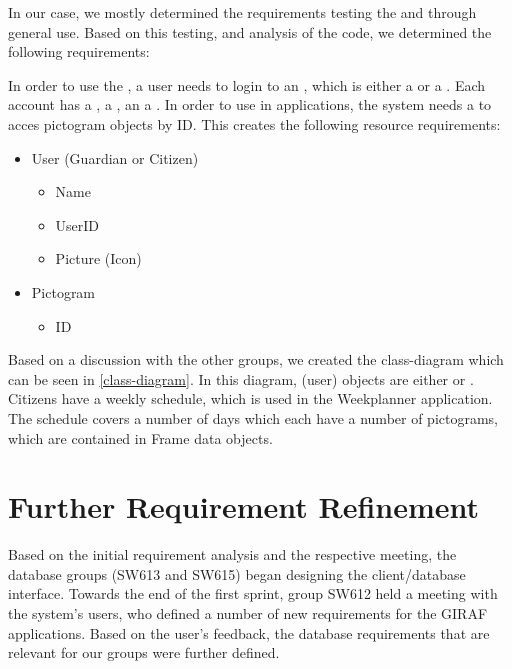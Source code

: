 In our case, we mostly determined the requirements testing the 
and  through general use. Based on this testing, and
analysis of the code, we determined the following requirements:\nl

In order to use the , a user needs to login to an
, which is either a  or a . Each
account has a , a , an a .
In order to use  in applications, the system needs a to acces
pictogram objects by ID.
This creates the following resource requirements:

\begin{itemize}
  \item User (Guardian or Citizen)
  	\begin{itemize}
  		\item Name
  		\item UserID
  		\item Picture (Icon) 
	\end{itemize}
  \item Pictogram
  	\begin{itemize}
  		\item ID
	\end{itemize}
\end{itemize}

Based on a discussion with the other groups, we created the class-diagram which
can be seen in \autoref{class-diagram}. In this diagram,  (user)
objects are either  or . Citizens have a
weekly schedule, which is used in the Weekplanner application. The schedule
covers a number of days which each have a number of pictograms, which are
contained in Frame data objects.


\section{Further Requirement Refinement}
Based on the initial requirement analysis and the respective meeting, the
database groups (SW613 and SW615) began designing the client/database interface.
Towards the end of the first sprint, group SW612 held a meeting with the
system's users, who defined a number of new requirements for the GIRAF
applications. Based on the user's feedback, the database requirements that are
relevant for our groups were further defined.

